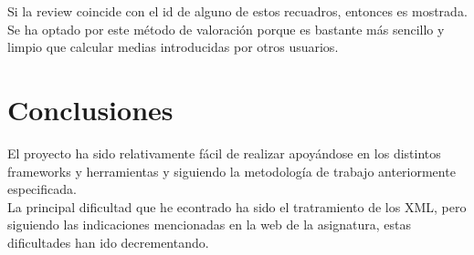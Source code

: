 \documentclass[11pt,a4paper]{article}
\begin{document}
Si la review coincide con el id de alguno de estos recuadros, entonces es mostrada.\\
Se ha optado por este método de valoración porque es bastante más sencillo y limpio que calcular medias introducidas por otros usuarios.

\section{Conclusiones}
El proyecto ha sido relativamente fácil de realizar apoyándose en los distintos frameworks y herramientas y siguiendo la metodología de trabajo anteriormente especificada.\\
La principal dificultad que he econtrado ha sido el tratramiento de los XML, pero siguiendo las indicaciones mencionadas en la web de la asignatura, estas dificultades han ido decrementando.\\
\end{document}
